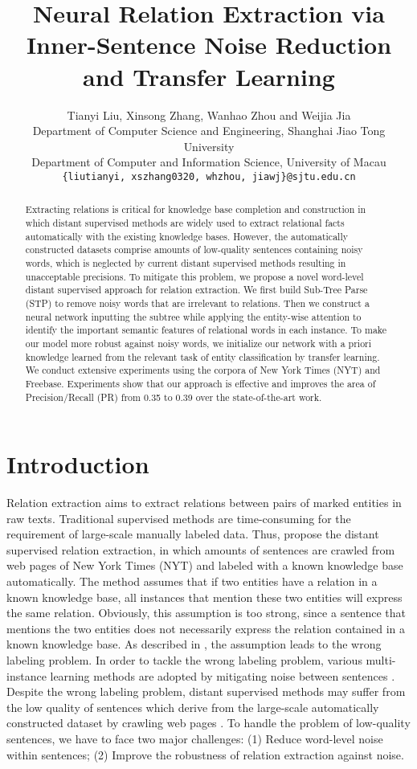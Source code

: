 \documentclass[11pt,a4paper]{article}
\title{Neural Relation Extraction via Inner-Sentence Noise Reduction and Transfer Learning}
\author{Tianyi Liu, Xinsong Zhang, Wanhao Zhou and Weijia Jia \\
  Department of Computer Science and Engineering, Shanghai Jiao Tong University \\
  Department of Computer and Information Science, University of Macau \\
  {\tt \{liutianyi, xszhang0320, whzhou, jiawj\}@sjtu.edu.cn} \\}
\date{}
\begin{document}
\maketitle
\begin{abstract}
  Extracting relations is critical for knowledge base completion and construction in which distant supervised methods are widely used to extract relational facts automatically with the existing knowledge bases. However, the automatically constructed datasets comprise amounts of low-quality sentences containing noisy words, which is neglected by current distant supervised methods resulting in unacceptable precisions. To mitigate this problem, we propose a novel word-level distant supervised approach for relation extraction. We first build Sub-Tree Parse (STP) to remove noisy words that are irrelevant to relations. Then we construct a neural network inputting the subtree while applying the entity-wise attention to identify the important semantic features of relational words in each instance. To make our model more robust against noisy words, we initialize our network with a priori knowledge learned from the relevant task of entity classification by transfer learning. We conduct extensive experiments using the corpora of New York Times (NYT) and Freebase. Experiments show that our approach is effective and improves the area of Precision/Recall (PR) from 0.35 to 0.39 over the state-of-the-art work.
\end{abstract}

\section{Introduction}
  Relation extraction aims to extract relations between pairs of marked entities in raw texts. Traditional supervised methods are time-consuming for the requirement of large-scale manually labeled data. Thus, \citet{mintz2009distant} propose the distant supervised relation extraction, in which amounts of sentences are crawled from web pages of New York Times (NYT) and labeled with a known knowledge base automatically. The method assumes that if two entities have a relation in a known knowledge base, all instances that mention these two entities will express the same relation. Obviously, this assumption is too strong, since a sentence that mentions the two entities does not necessarily express the relation contained in a known knowledge base. As described in \citet{riedel2010modeling}, the assumption leads to the wrong labeling problem. In order to tackle the wrong labeling problem, various multi-instance learning methods are adopted by mitigating noise between sentences \citep{hoffmann2011knowledge,surdeanu2012multi,zeng2015distant,lin2016neural}. Despite the wrong labeling problem, distant supervised methods may suffer from the low quality of sentences which derive from the large-scale automatically constructed dataset by crawling web pages \citep{yang2017crowdsourced}. To handle the problem of low-quality sentences, we have to face two major challenges: (1) Reduce word-level noise within sentences; (2) Improve the robustness of relation extraction against noise.
  
\end{document}
